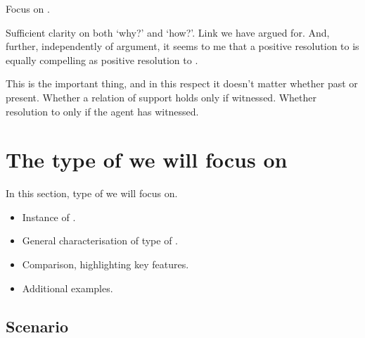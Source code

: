 \begin{note}
  Focus on \issueConstraint{}.
  \vspace{-\baselineskip}
  \begin{quote}
    \rIssueConstraint*
  \end{quote}
  Sufficient clarity on both `why?' and `how?'.
  Link we have argued for.
  And, further, independently of argument, it seems to me that a positive resolution to \issueConstraint{} is equally compelling as positive resolution to \issueInclusion{}.
\end{note}

\begin{note}
  This is the important thing, and in this respect it doesn't matter whether past or present.
  Whether a relation of support holds only if witnessed.
  Whether resolution to \qWhy{} only if the agent has witnessed.
\end{note}

\section{The type of  we will focus on}
\label{sec:clar:type-of-scen}

\begin{note}
  In this section, type of  we will focus on.
  \begin{itemize}
  \item
    Instance of .
  \item
    General characterisation of type of .
  \item
    Comparison, highlighting key features.
  \item
    Additional examples.
  \end{itemize}
\end{note}

\subsection{Scenario}


